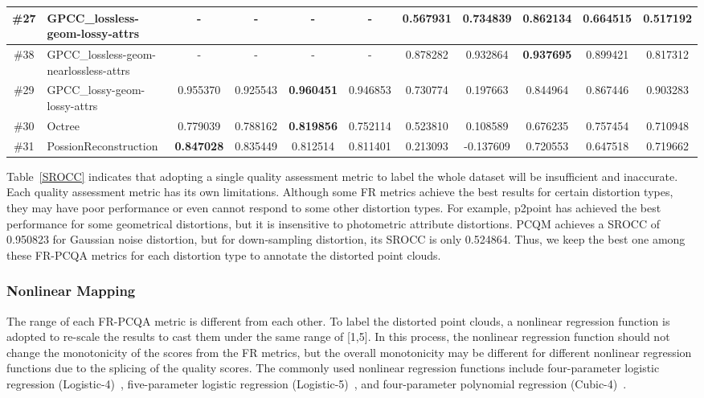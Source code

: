 \documentclass[acmsmall]{acmart}
\begin{document}
\begin{table*}[t]
{\begin{tabular}{c|p{8em}|c|c|c|c|c|c|c|c|c}
    \hline
    \#27  & GPCC\_lossless-geom-lossy-attrs & -     & -     & -     & -     & 0.567931 & 0.734839 & \textbf{0.862134} & 0.664515 & 0.517192  \\
    \hline
    \#38  & GPCC\_lossless-geom-nearlossless-attrs & -     & -     & -     & -     & 0.878282 & 0.932864 & \textbf{0.937695} & 0.899421 & 0.817312  \\
    \hline
    \#29  & GPCC\_lossy-geom-lossy-attrs & 0.955370 & 0.925543 & \textbf{0.960451} & 0.946853 & 0.730774 & 0.197663 & 0.844964 & 0.867446 & 0.903283  \\
    \hline
    \#30  & Octree & 0.779039 & 0.788162 & \textbf{0.819856} & 0.752114 & 0.523810 & 0.108589 & 0.676235 & 0.757454 & 0.710948  \\
    \hline
    \#31  & Possion\newline{}Reconstruction & \textbf{0.847028} & 0.835449 & 0.812514 & 0.811401 & 0.213093 & -0.137609 & 0.720553 & 0.647518 & 0.719662  \\
    \hline
    \end{tabular}}
  \label{SROCC}\end{table*}


\par Table~\ref{SROCC} indicates that adopting a single quality assessment metric to label the whole dataset will be insufficient and inaccurate. Each quality assessment metric has its own limitations. Although some FR metrics achieve the best results for certain distortion types, they may have poor performance or even cannot respond to some other distortion types. For example, p2point has achieved the best performance for some geometrical distortions, but it is insensitive to photometric attribute distortions. PCQM achieves a SROCC of 0.950823 for Gaussian noise distortion, but for down-sampling distortion, its SROCC is only 0.524864. Thus, we keep the best one among these FR-PCQA metrics for each distortion type to annotate the distorted point clouds.




\subsubsection{Nonlinear Mapping}

\par The range of each FR-PCQA metric is different from each other. To label the distorted point clouds, a nonlinear regression function is adopted to re-scale the results to cast them under the same range of [1,5]. In this process, the nonlinear regression function should not change the monotonicity of the scores from the FR metrics, but the overall monotonicity may be different for different nonlinear regression functions due to the splicing of the quality scores. The commonly used nonlinear regression functions include four-parameter logistic regression (Logistic-4)~\cite{2000logistic4}, five-parameter logistic regression (Logistic-5)~\cite{Sheikh2006CSIQ}, and four-parameter polynomial regression (Cubic-4)~\cite{2012cubic4,2010cubic4}.
\end{document}
